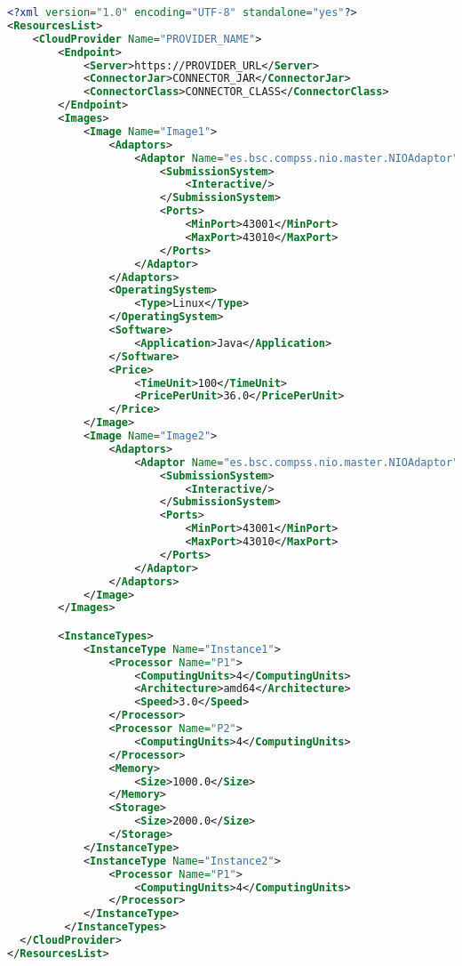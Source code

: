 \begin{lstlisting}[language=xml]
<?xml version="1.0" encoding="UTF-8" standalone="yes"?>
<ResourcesList>
    <CloudProvider Name="PROVIDER_NAME">
        <Endpoint>
            <Server>https://PROVIDER_URL</Server>
            <ConnectorJar>CONNECTOR_JAR</ConnectorJar>
            <ConnectorClass>CONNECTOR_CLASS</ConnectorClass>
        </Endpoint>
        <Images>
            <Image Name="Image1">
                <Adaptors>
                    <Adaptor Name="es.bsc.compss.nio.master.NIOAdaptor">
                        <SubmissionSystem>
                            <Interactive/>
                        </SubmissionSystem>
                        <Ports>
                            <MinPort>43001</MinPort>
                            <MaxPort>43010</MaxPort>
                        </Ports>
                    </Adaptor>
                </Adaptors>
                <OperatingSystem>
                    <Type>Linux</Type>
                </OperatingSystem>
                <Software>
                    <Application>Java</Application>
                </Software>
                <Price>
                    <TimeUnit>100</TimeUnit>
                    <PricePerUnit>36.0</PricePerUnit>
                </Price>
            </Image>
            <Image Name="Image2">
                <Adaptors>
                    <Adaptor Name="es.bsc.compss.nio.master.NIOAdaptor">
                        <SubmissionSystem>
                            <Interactive/>
                        </SubmissionSystem>
                        <Ports>
                            <MinPort>43001</MinPort>
                            <MaxPort>43010</MaxPort>
                        </Ports>
                    </Adaptor>
                </Adaptors>
            </Image>
        </Images>

        <InstanceTypes>
            <InstanceType Name="Instance1">
                <Processor Name="P1">
                    <ComputingUnits>4</ComputingUnits>
                    <Architecture>amd64</Architecture>
                    <Speed>3.0</Speed>
                </Processor>
                <Processor Name="P2">
                    <ComputingUnits>4</ComputingUnits>
                </Processor>
                <Memory>
                    <Size>1000.0</Size>
                </Memory>
                <Storage>
                    <Size>2000.0</Size>
                </Storage>
            </InstanceType>
            <InstanceType Name="Instance2">
                <Processor Name="P1">
                    <ComputingUnits>4</ComputingUnits>
                </Processor>
            </InstanceType>
         </InstanceTypes>
  </CloudProvider>
</ResourcesList>
\end{lstlisting}

